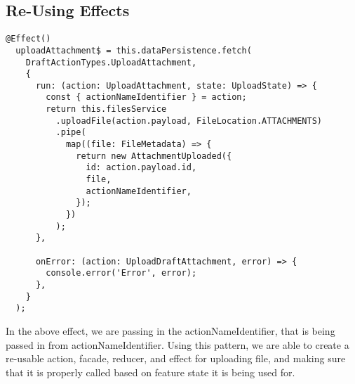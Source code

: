 \subsection{Re-Using Effects}
\begin{lstlisting}
@Effect()
  uploadAttachment$ = this.dataPersistence.fetch(
    DraftActionTypes.UploadAttachment,
    {
      run: (action: UploadAttachment, state: UploadState) => {
        const { actionNameIdentifier } = action;
        return this.filesService
          .uploadFile(action.payload, FileLocation.ATTACHMENTS)
          .pipe(
            map((file: FileMetadata) => {
              return new AttachmentUploaded({
                id: action.payload.id,
                file,
                actionNameIdentifier,
              });
            })
          );
      },

      onError: (action: UploadDraftAttachment, error) => {
        console.error('Error', error);
      },
    }
  );
\end{lstlisting}

In the above effect, we are passing in the actionNameIdentifier, that is being
passed in from actionNameIdentifier. Using this pattern, we are able to create a
re-usable action, facade, reducer, and effect for uploading file, and making
sure that it is properly called based on feature state it is being used for. 
